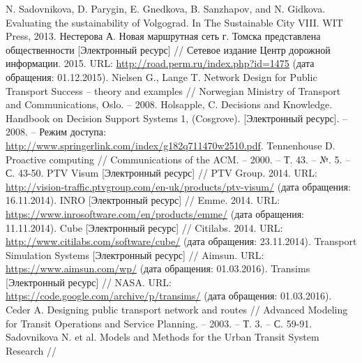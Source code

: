\renewcommand{\bibname}{%
    \vspace{-2em}\begin{center}
        Список используемой литературы
    \end{center}\vspace{-2em}
}

\pagestyle{empty}

\begin{thebibliography}{10}
     N. Sadovnikova, D. Parygin, E. Gnedkova, B. Sanzhapov, and N. Gidkova. 
        Evaluating the sustainability of Volgograd. In The Sustainable City VIII. WIT Press, 2013.
     Нестерова А. Новая маршрутная сеть г. Томска представлена общественности 
        [Электронный ресурс] // Сетевое издание Центр дорожной информации. 2015. URL: 
        \url{http://road.perm.ru/index.php?id=1475} (дата обращения: 01.12.2015).
     Nielsen G., Lange T. Network Design for Public Transport Success -- theory and 
        examples // Norwegian Ministry of Transport and Communications, Oslo. -- 2008.
     Holsapple, C. Decisions and Knowledge. Handbook on Decision Support Systems 1, 
        (Cosgrove). [Электронный ресурс]. -- 2008. -- Режим доступа: 
        \url{http://www.springerlink.com/index/g182q711470w2510.pdf}.
     Tennenhouse D. Proactive computing //
        Communications of the ACM. -- 2000. -- Т. 43. -- №. 5. -- С. 43-50.
     PTV Visum [Электронный ресурс] // PTV Group. 2014. URL: 
        \url{http://vision-traffic.ptvgroup.com/en-uk/products/ptv-visum/} 
        (дата обращения: 16.11.2014).
     INRO [Электронный ресурс] // Emme. 2014. URL: 
        \url{https://www.inrosoftware.com/en/products/emme/} (дата обращения: 11.11.2014).
     Cube [Электронный ресурс] // Citilabs. 2014. URL: 
        \url{http://www.citilabs.com/software/cube/} (дата обращения: 23.11.2014).
     Transport Simulation Systems [Электронный ресурс] // Aimsun. URL: 
        \url{https://www.aimsun.com/wp/} (дата обращения: 01.03.2016).
     Transims [Электронный ресурс] // NASA. URL: 
        \url{https://code.google.com/archive/p/transims/} (дата обращения: 01.03.2016).
     Ceder A. Designing public transport network and routes //
        Advanced Modeling for Transit Operations and Service Planning. -- 2003. -- Т. 3. -- С. 59-91.
     Sadovnikova N. et al. Models and Methods for the Urban Transit System Research //

\end{thebibliography}
